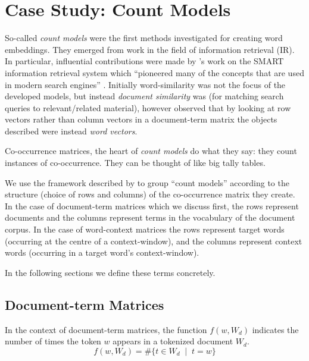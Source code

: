 \chapter{Case Study: Count Models}\label{chap:count-models}
So-called \emph{count models} were the first methods investigated for creating word embeddings. They emerged from work in the field of information retrieval (IR). In particular, influential contributions \parencite{dublin-2004-the-most-influential} were made by \citeauthor{salton-1975-a-vector-space-model}'s \parencite*{salton-1975-a-vector-space-model} work on the SMART information retrieval system which ``pioneered many of the concepts that are used in modern search engines'' \parencite{turney10-from-frequen-to-meanin}. Initially word-similarity was not the focus of the developed models, but instead \emph{document similarity} was (for matching search queries to relevant/related material), however \textcite{deerwester-1990-indexing-by-lsa} observed that by looking at row vectors rather than column vectors in a document-term matrix the objects described were instead \emph{word vectors}.

Co-occurrence matrices, the heart of \emph{count models} do what they say: they count instances of co-occurrence. They can be thought of like big tally tables.

We use the framework described by \textcite{turney10-from-frequen-to-meanin} to group ``count models'' according to the structure (choice of rows and columns) of the co-occurrence matrix they create. In the case of document-term matrices which we discuss first, the rows represent documents and the columns represent terms in the vocabulary of the document corpus. In the case of word-context matrices the rows represent target words (occurring at the centre of a context-window), and the columns represent context words (occurring in a target word's context-window).

In the following sections we define these terms concretely.

\section{Document-term Matrices}
\begin{definition}
  In the context of document-term matrices, the function $f(w,W_d)$ indicates the number of times the token $w$ appears in a tokenized document $W_d$.
  \begin{equation}
    f(w,W_d)= \#\{t\in W_d\;\mid\;t=w\}
  \end{equation}
\end{definition}

